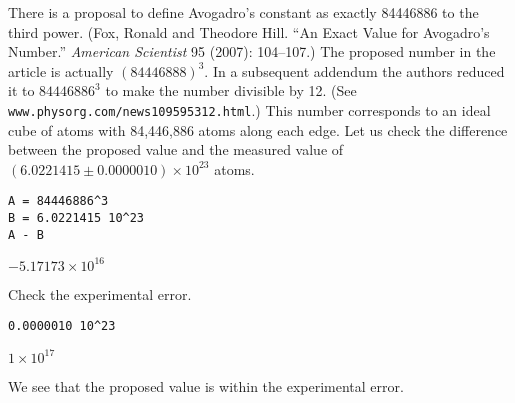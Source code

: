 \documentclass[12pt]{article}
\begin{document}
There is a proposal to define Avogadro's constant as exactly
84446886 to the third power.
(Fox, Ronald and Theodore Hill.
``An Exact Value for Avogadro's Number.''
{\it American Scientist} 95 (2007): 104--107.)
The proposed number in the article is actually $(84446888)^3$.
In a subsequent addendum the authors reduced it to $84446886^3$ to make the
number divisible by 12. (See {\tt www.physorg.com/news109595312.html}.)
This number corresponds to an ideal cube of atoms with 84,446,886
atoms along each edge.
Let us check the difference between the proposed value and the measured value
of $(6.0221415\pm0.0000010)\times10^{23}$ atoms.

\begin{Verbatim}[formatcom=\color{blue},samepage=true]
A = 84446886^3
B = 6.0221415 10^23
A - B
\end{Verbatim}

$-5.17173\times10^{16}$

\bigskip
Check the experimental error.

\begin{Verbatim}[formatcom=\color{blue},samepage=true]
0.0000010 10^23
\end{Verbatim}

$1\times10^{17}$

\bigskip
We see that the proposed value is within the experimental error.
\end{document}
